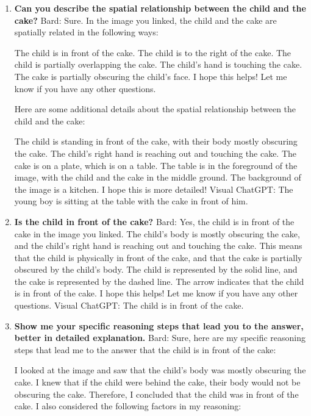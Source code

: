     \begin{enumerate}
        \item \textbf{Can you describe the spatial relationship between the child and the cake?}
        \subitem Bard: 
        Sure. In the image you linked, the child and the cake are spatially related in the following ways:
        
        The child is in front of the cake.
        The child is to the right of the cake.
        The child is partially overlapping the cake.
        The child's hand is touching the cake.
        The cake is partially obscuring the child's face.
        I hope this helps! Let me know if you have any other questions.
        
        Here are some additional details about the spatial relationship between the child and the cake:
        
        The child is standing in front of the cake, with their body mostly obscuring the cake.
        The child's right hand is reaching out and touching the cake.
        The cake is on a plate, which is on a table.
        The table is in the foreground of the image, with the child and the cake in the middle ground.
        The background of the image is a kitchen.
        I hope this is more detailed!
        \subitem Visual ChatGPT: The young boy is sitting at the table with the cake in front of him.
        \item \textbf{Is the child in front of the cake?}
        \subitem Bard: 
        Yes, the child is in front of the cake in the image you linked. The child's body is mostly obscuring the cake, and the child's right hand is reaching out and touching the cake. This means that the child is physically in front of the cake, and that the cake is partially obscured by the child's body.
        The child is represented by the solid line, and the cake is represented by the dashed line. The arrow indicates that the child is in front of the cake.
        I hope this helps! Let me know if you have any other questions.
        \subitem Visual ChatGPT: The child is in front of the cake.
        \item \textbf{Show me your specific reasoning steps that lead you to the answer, better in detailed explanation.}
        \subitem Bard:
        Sure, here are my specific reasoning steps that lead me to the answer that the child is in front of the cake:

        I looked at the image and saw that the child's body was mostly obscuring the cake.
        I knew that if the child were behind the cake, their body would not be obscuring the cake.
        Therefore, I concluded that the child was in front of the cake.
        I also considered the following factors in my reasoning:


\end{enumerate}
